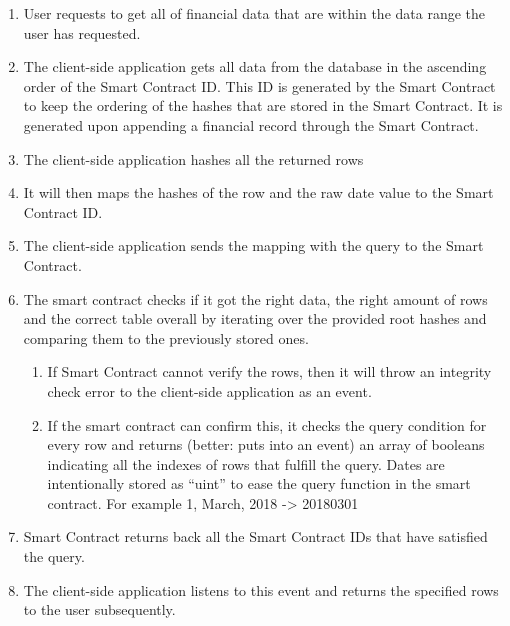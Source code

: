 \begin{enumerate}
\item User requests to get all of financial data that are within the data range the user has requested.
\item The client-side application gets all data from the database in the ascending order of the Smart Contract ID. This ID is generated by the Smart Contract to keep the ordering of the hashes that are stored in the Smart Contract. It is generated upon appending a financial record through the Smart Contract. 
\item The client-side application hashes all the returned rows
\item It will then maps the hashes of the row and the raw date value to the Smart Contract ID.  
\item The client-side application sends the mapping with the query to the Smart Contract.
\item The smart contract checks if it got the right data, the right amount of rows and the correct table overall by iterating over the provided root hashes and comparing them to the previously stored ones.
	\begin{enumerate}
	\item If Smart Contract cannot verify the rows, then it will throw an integrity check error to the client-side application as an event. 
	\item If the smart contract can confirm this, it checks the query condition for every row and returns (better: puts into an event) an array of booleans indicating all the indexes of rows that fulfill the query. Dates are intentionally stored as “uint” to ease the query function in the smart contract. For example 1, March, 2018 -> 20180301
	\end{enumerate}
\item Smart Contract returns back all the Smart Contract IDs that have satisfied the query.
\item The client-side application listens to this event and returns the specified rows to the user subsequently.
\end{enumerate}



